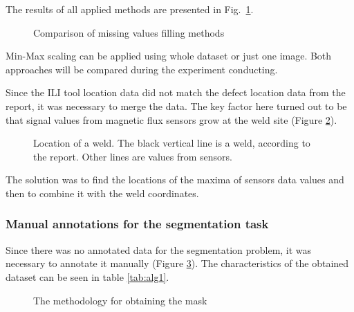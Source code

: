 The results of all applied methods are presented in Fig.~\ref{ris:filling_example}.
\begin{figure}[ht]
	\caption{Comparison of missing values filling methods}
	\label{ris:filling_example}
\end{figure}

Min-Max scaling can be applied using whole dataset or just one image.
Both approaches will be compared during the experiment conducting.

Since the ILI tool location data did not match the defect location data from the report, it was necessary to merge the data. The key factor here turned out to be that signal values from magnetic flux sensors grow at the weld site (Figure \ref{ris:prepr}). 

\begin{figure}[!h]
	\caption{Location of a weld. The black vertical line is a weld, according to the report. Other lines are values from sensors.}
	\label{ris:prepr}
\end{figure}
The solution was to find the locations of the maxima of sensors data values and then to combine it with the weld coordinates.

\subsubsection{Manual annotations for the segmentation task}
Since there was no annotated data for the segmentation problem, it was necessary to annotate it manually (Figure \ref{ris:annot}). The characteristics of the obtained dataset can be seen in table \ref{tab:alg1}.

\begin{figure}[ht]
	\caption{The methodology for obtaining the mask}
	\label{ris:annot}
\end{figure}

